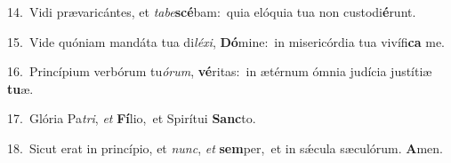 {\numbfont\textcolor{\numbcolor}{14.}}~Vidi prævaricántes, et \textit{ta}\-\textit{be}\textbf{scé}bam:~\star quia elóquia tua non custodi\-\textbf{é}\-runt.\par
{\numbfont\textcolor{\numbcolor}{15.}}~Vide quóniam mandáta tua di\-\textit{lé}\-\textit{xi}, \textbf{Dó}\-mine:~\star in misericórdia tua vivífi\textbf{ca} me.\par
{\numbfont\textcolor{\numbcolor}{16.}}~Princípium verbórum tu\-\textit{ó}\-\textit{rum}, \textbf{vé}\-ritas:~\star in ætérnum ómnia judícia justítiæ \textbf{tu}\-æ.\par
{\numbfont\textcolor{\numbcolor}{17.}}~Glória Pa\-\textit{tri}\-, \textit{et} \textbf{Fí}\-lio,~\star et Spirítui \textbf{Sanc}\-to.\par
{\numbfont\textcolor{\numbcolor}{18.}}~Sicut erat in princípio, et \textit{nunc}\-, \textit{et} \textbf{sem}\-per,~\star et in sǽcula sæculórum. \textbf{A}\-men.\par
